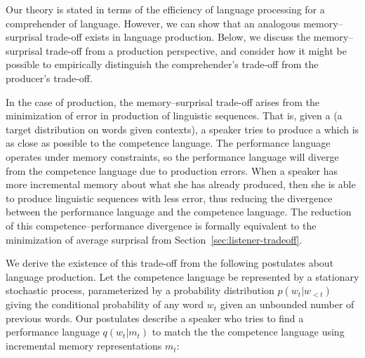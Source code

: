 Our theory is stated in terms of the efficiency of language processing for a comprehender of language. However, we can show that an analogous memory--surprisal trade-off exists in language production. Below, we discuss the memory--surprisal trade-off from a production perspective, and consider how it might be possible to empirically distinguish the comprehender's trade-off from the producer's trade-off.

In the case of production, the memory--surprisal trade-off arises from the minimization of error in production of linguistic sequences. That is, given a  (a target distribution on words given contexts), a speaker tries to produce a  which is as close as possible to the competence language. The performance language operates under memory constraints, so the performance language will diverge from the competence language due to production errors. When a speaker has more incremental memory about what she has already produced, then she is able to produce linguistic sequences with less error, thus reducing the divergence between the performance language and the competence language. The reduction of this competence--performance divergence is formally equivalent to the minimization of average surprisal from Section~\ref{sec:listener-tradeoff}.


We derive the existence of this trade-off from the following postulates about language production. Let the competence language be represented by a stationary stochastic process, parameterized by a probability distribution $p(w_t | w_{<t})$ giving the conditional probability of any word $w_t$ given an unbounded number of previous words. Our postulates describe a speaker who tries to find a performance language $q(w_t|m_t)$ to match the the competence language using incremental memory representations $m_t$:

